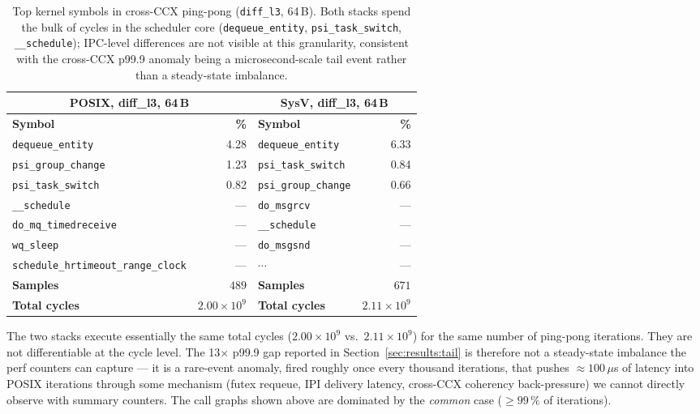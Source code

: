 \documentclass[a4paper,11pt]{article}
\begin{document}
\begin{table}[H]
\centering
\caption{Top kernel symbols in cross-CCX ping-pong (\texttt{diff\_l3},
64\,B). Both stacks spend the bulk of cycles in the scheduler core
(\texttt{dequeue\_entity}, \texttt{psi\_task\_switch},
\texttt{\_\_schedule}); IPC-level differences are not visible at this
granularity, consistent with the cross-CCX p99.9 anomaly being a
microsecond-scale tail event rather than a steady-state imbalance.}
\label{tab:tp_hotfn_pp}
\footnotesize
\begin{tabular}{lrlr}
\toprule
\multicolumn{2}{c}{\textbf{POSIX, diff\_l3, 64\,B}}
& \multicolumn{2}{c}{\textbf{SysV, diff\_l3, 64\,B}} \\
\midrule
\textbf{Symbol} & \textbf{\%}
& \textbf{Symbol} & \textbf{\%} \\
\midrule
\texttt{dequeue\_entity}                & 4.28 &
\texttt{dequeue\_entity}                & 6.33 \\
\texttt{psi\_group\_change}             & 1.23 &
\texttt{psi\_task\_switch}              & 0.84 \\
\texttt{psi\_task\_switch}              & 0.82 &
\texttt{psi\_group\_change}             & 0.66 \\
\texttt{\_\_schedule}                   & --- &
\texttt{do\_msgrcv}                     & --- \\
\texttt{do\_mq\_timedreceive}           & --- &
\texttt{\_\_schedule}                   & --- \\
\texttt{wq\_sleep}                      & --- &
\texttt{do\_msgsnd}                     & --- \\
\texttt{schedule\_hrtimeout\_range\_clock} & --- &
$\cdots$                                & --- \\
\textbf{Samples} & $489$ &
\textbf{Samples} & $671$ \\
\textbf{Total cycles}        & $2.00\times 10^9$ &
\textbf{Total cycles}        & $2.11\times 10^9$ \\
\bottomrule
\end{tabular}
\end{table}

The two stacks execute essentially the same total cycles
($2.00\times 10^9$ vs.\ $2.11\times 10^9$) for the same number of
ping-pong iterations. They are not differentiable at the cycle level.
The 13$\times$ p99.9 gap reported in
Section~\ref{sec:results:tail} is therefore not a steady-state
imbalance the perf counters can capture --- it is a rare-event
anomaly, fired roughly once every thousand iterations, that pushes
$\approx 100$\,$\mu$s of latency into POSIX iterations through some
mechanism (futex requeue, IPI delivery latency, cross-CCX coherency
back-pressure) we cannot directly observe with summary counters. The
call graphs shown above are dominated by the \emph{common} case
($\geq 99\,\%$ of iterations).
\end{document}
